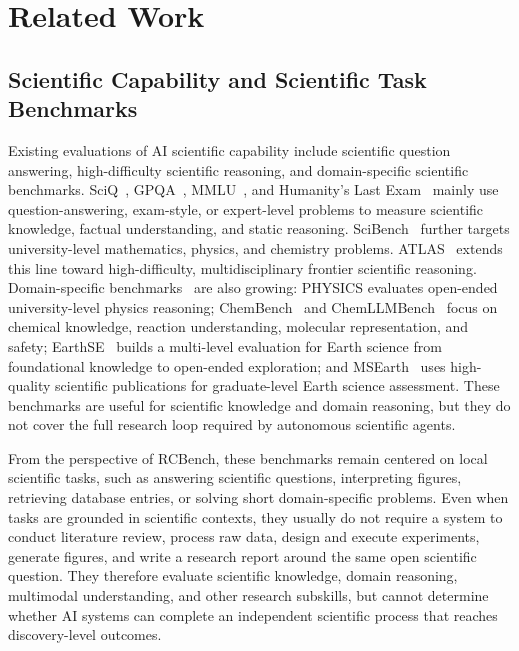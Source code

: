 \section{Related Work}
\subsection{Scientific Capability and Scientific Task Benchmarks}
Existing evaluations of AI scientific capability include scientific question answering, high-difficulty scientific reasoning, and domain-specific scientific benchmarks. SciQ~\citep{welbl2017crowdsourcing}, GPQA~\citep{rein2023gpqa}, MMLU~\citep{wang2024mmlu}, and Humanity's Last Exam~\citep{phan2025humanity} mainly use question-answering, exam-style, or expert-level problems to measure scientific knowledge, factual understanding, and static reasoning. SciBench~\citep{wang2023scibench} further targets university-level mathematics, physics, and chemistry problems. ATLAS~\citep{liu2025atlas} extends this line toward high-difficulty, multidisciplinary frontier scientific reasoning. Domain-specific benchmarks~\citep{anjum2025domain} are also growing: PHYSICS evaluates open-ended university-level physics reasoning; ChemBench~\citep{walker2010chembench} and ChemLLMBench~\citep{guo2023can} focus on chemical knowledge, reaction understanding, molecular representation, and safety; EarthSE~\citep{xu2025earthse} builds a multi-level evaluation for Earth science from foundational knowledge to open-ended exploration; and MSEarth~\citep{zhao2025msearth} uses high-quality scientific publications for graduate-level Earth science assessment. These benchmarks are useful for scientific knowledge and domain reasoning, but they do not cover the full research loop required by autonomous scientific agents.

From the perspective of RCBench, these benchmarks remain centered on local scientific tasks, such as answering scientific questions, interpreting figures, retrieving database entries, or solving short domain-specific problems. Even when tasks are grounded in scientific contexts, they usually do not require a system to conduct literature review, process raw data, design and execute experiments, generate figures, and write a research report around the same open scientific question. They therefore evaluate scientific knowledge, domain reasoning, multimodal understanding, and other research subskills, but cannot determine whether AI systems can complete an independent scientific process that reaches discovery-level outcomes.

